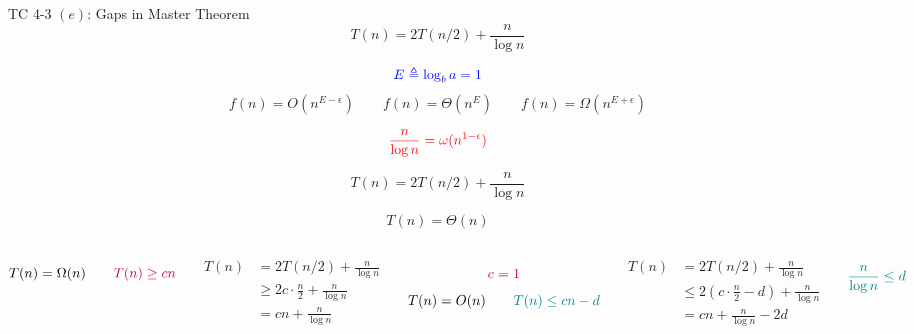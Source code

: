 \begin{frame}{}
  \begin{exampleblock}{TC 4-3 $(e)$: Gaps in Master Theorem}
    \[
      T(n) = 2T(n/2) + \frac{n}{\log n}
    \]
  \end{exampleblock}

  \pause
  \[
    \textcolor{blue}{E \triangleq \log_b a = 1}
  \]
  \[
    f(n) = O(n^{E - \epsilon}) \qquad f(n) = \Theta(n^E) \qquad f(n) = \Omega(n^{E + \epsilon})
  \]

  \pause
  \[
    \textcolor{red}{\frac{n}{\log n} = \omega(n^{1 - \epsilon})}
  \]
\end{frame}

\begin{frame}{}
\end{frame}

\begin{frame}{}
  \[
    T(n) = 2T(n/2) + \frac{n}{\log n}
  \]

  \pause
  \[
    \boxed{T(n) = \Theta(n)}
  \]

  \begin{columns}
      \pause
      \[
        T(n) = \Omega(n) \qquad \textcolor{purple}{T(n) \ge cn}
      \]

      \pause
      \begin{align*}
        T(n) &= 2T(n/2) + \frac{n}{\log n} \\
             &\ge 2 c \cdot \frac{n}{2} + \frac{n}{\log n} \\
             &= cn + \frac{n}{\log n}
      \end{align*}

      \pause
      \[
        \textcolor{purple}{c = 1}
      \]
      \pause
      \[
        T(n) = O(n) \qquad \textcolor{teal}{T(n) \le cn - d}
      \]

      \pause
      \begin{align*}
        T(n) &= 2T(n/2) + \frac{n}{\log n} \\
             &\le 2 (c \cdot \frac{n}{2} - d) + \frac{n}{\log n} \\
             &= cn + \frac{n}{\log n} - 2d
      \end{align*}

      \pause
      \[
        \textcolor{teal}{\frac{n}{\log n} \le d}
      \]
  \end{columns}
\end{frame}

